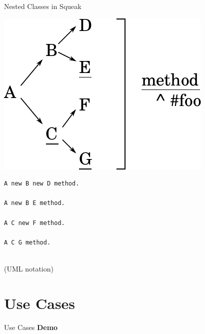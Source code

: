 \documentclass[xcolor=dvipsname, handout]{beamer} %
\begin{document}
\begin{frame}[fragile]{Nested Classes in Squeak}
\begin{minipage}{.5\textwidth}
  \includegraphics[width=\textwidth]{nested_classes.pdf}
\end{minipage}%
\begin{minipage}{.1\textwidth}
\qquad
\end{minipage}%
\begin{minipage}{.4\textwidth}
  \begin{lstlisting}
A new B new D method.

A new B E method.

A C new F method.

A C G method.


  \end{lstlisting}
(UML notation)

\end{minipage}


\end{frame}

\section{Use Cases}
\begin{frame}{Use Cases}
  \centering
  \textbf{Demo}
\end{frame}
\end{document}
